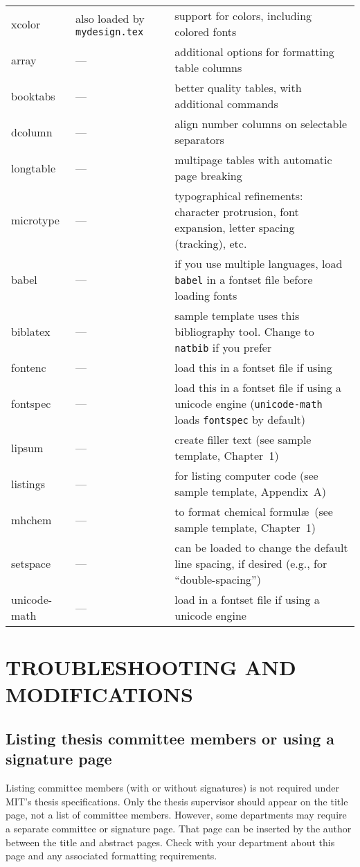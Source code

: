 \documentclass[11pt]{article}
\newcommand*\pdfTeX{\hologo{pdfTeX}}
\begin{document}
\begin{table}
{\begin{tabular*}{\textwidth}{>{\ttfamily}l<{}@{\extracolsep{\fill}}p{18em} p{22em} }
xcolor	   & also loaded by \texttt{mydesign.tex} 		& support for colors, including colored fonts \\[0.7em]
array	   & --- & additional options for formatting table columns \\
booktabs   & --- & better quality tables, with additional commands \\
dcolumn    & --- & align number columns on selectable separators \\
longtable  & --- & multipage tables with automatic page breaking \\
microtype  & --- & typographical refinements: character protrusion, font expansion, letter spacing (tracking), etc. \\
\midrule
babel	 & --- & if you use multiple languages, load \texttt{babel} in a fontset file before loading fonts \\
biblatex & --- & sample template uses this bibliography tool. Change to \texttt{natbib} if you prefer\\
fontenc	 & --- & load this in a fontset file if using \pdfTeX\\
fontspec & --- & load this in a fontset file if using a unicode engine (\texttt{unicode-math} loads \texttt{fontspec} by default)\\
lipsum   & --- & create filler text (see sample template, Chapter~1) \\
listings & --- & for listing computer code (see sample template, Appendix~A) \\
mhchem   & --- & to format chemical formul\ae\ (see sample template, Chapter~1) \\
setspace & --- & can be loaded to change the default line spacing, if desired (e.g., for ``double-spacing'')\\
unicode-math & --- & load in a fontset file if using a unicode engine\\
\bottomrule
\end{tabular*}}%
\end{table}

\section{TROUBLESHOOTING AND MODIFICATIONS}

\subsection{Listing thesis committee members or using a signature page}
Listing committee members (with or without signatures) is not required under MIT's thesis specifications. Only the thesis supervisor should appear on the title page, not a list of committee members.  However, some departments may require a separate committee or signature page.  That page can be inserted by the author between the title and abstract pages.  Check with your department about this page and any associated formatting requirements. 
\end{document}
